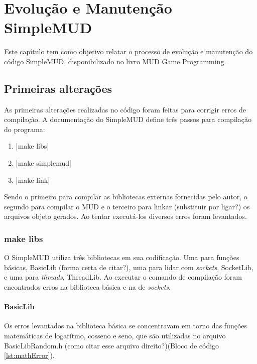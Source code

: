 \chapter[Evolução e Manutenção SimpleMUD]{Evolução e Manutenção SimpleMUD}

Este capítulo tem como objetivo relatar o processo de evolução e manutenção do código SimpleMUD, 
disponibilizado no livro MUD Game Programming.

\section{Primeiras alterações}

As primeiras alterações realizadas no código foram feitas para corrigir erros de compilação. 
A documentação do SimpleMUD define três passos para compilação do programa:

\begin{enumerate}
    \item {}|make libs|
    \item {}|make simplemud|
    \item {}|make link|
\end{enumerate}

Sendo o primeiro para compilar as bibliotecas externas fornecidas pelo autor, 
o segundo para compilar o MUD e o terceiro para linkar (substituir por ligar?) 
os arquivos objeto gerados. Ao tentar executá-los diversos erros foram levantados.

\subsection{make libs}

O SimpleMUD utiliza três bibliotecas em sua codificação. 
Uma para funções básicas, BasicLib (forma certa de citar?), uma para lidar com \textit{sockets}, 
SocketLib, e uma para \textit{threads}, ThreadLib. Ao executar o comando de compilação 
foram encontrados erros na biblioteca básica e na de \textit{sockets}.

\subsubsection{BasicLib}

Os erros levantados na biblioteca básica se concentravam em torno das funções matemáticas 
de logarítmo, cosseno e seno, que são utilizadas no arquivo BasicLibRandom.h 
(como citar esse arquivo direito?)(Bloco de código \ref{lst:mathError}).

